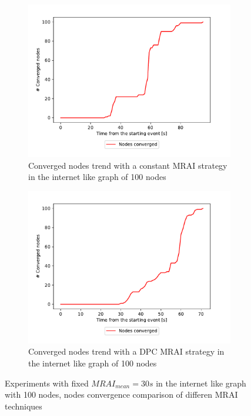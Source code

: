 \documentclass[10pt,conference,letterpaper]{IEEEtran}
\newcommand{\figwidth}{0.78}
\newcommand{\figvspace}{-1.5em}
\begin{document}
\begin{figure}[tb]
	\centering

	\begin{subfigure}{\columnwidth}
		\centering
		\includegraphics[width=\figwidth\columnwidth]{images/internet_like/S_AW/30fixed/converged_nodes-100-constant-30.pdf}
		\caption{Converged nodes trend with a constant \ac{MRAI} strategy in the internet like graph of \num{100} nodes}
		\label{fig:s_aw_converged_nodes_constant_100}
		\qquad
	\end{subfigure}

	\begin{subfigure}{\columnwidth}
		\centering
		\includegraphics[width=\figwidth\columnwidth]{images/internet_like/S_AW/30fixed/converged_nodes-100-dpc-30.pdf}
		\caption{Converged nodes trend with a \ac{DPC} \ac{MRAI} strategy in the internet like graph of \num{100} nodes}
		\label{fig:s_aw_converged_nodes_dpc_100}
		\qquad
	\end{subfigure}

	\caption{Experiments with fixed $MRAI_{mean} = 30s$ in the internet like graph with \ac{100}
			nodes, nodes convergence comparison of differen \ac{MRAI} techniques
			}
	\label{fig:s_aw_converged_nodes_100}
	\vspace{\figvspace}
\end{figure}
\end{document}
